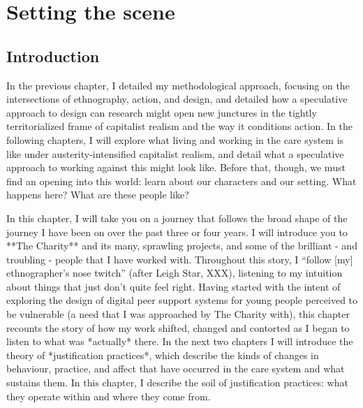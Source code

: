 \chapter{Setting the scene}
\label{}

\section{Introduction}
\label{sec:}

In the previous chapter, I detailed my methodological approach, focusing on the intersections of ethnography, action, and design, and detailed how a speculative approach to design can research might open new junctures in the tightly territorialized frame of capitalist realism and the way it conditions action. In the following chapters, I will explore what living and working in the care system is like under austerity-intensified capitalist realism, and detail what a speculative approach to working against this might look like. Before that, though, we must find an opening into this world: learn about our characters and our setting. What happens here? What are these people like? 

In this chapter, I will take you on a journey that follows the broad shape of  the journey I have been on over the past three or four years. I will introduce you to **The Charity** and its many, sprawling projects, and some of the brilliant - and troubling - people that I have worked with. Throughout this story, I “follow [my] ethnographer’s nose twitch” (after Leigh Star, XXX), listening to my intuition about things that just don’t quite feel right. Having started with the intent of exploring the design of digital peer support systems for young people perceived to be vulnerable (a need that I was approached by The Charity with), this chapter recounts the story of how my work shifted, changed and contorted as I began to listen to what was *actually* there. In the next two chapters I will introduce the theory of *justification practices*, which describe the kinds of changes in behaviour, practice, and affect that have occurred in the care system and what sustains them. In this chapter, I describe the soil of justification practices: what they operate within and where they come from. 





